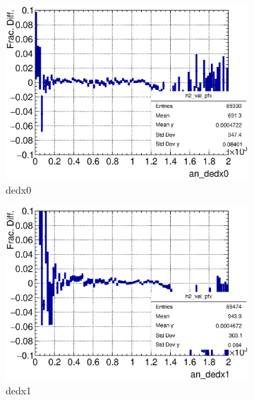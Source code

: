  \begin{figure}[t]
      \centering
      \begin{subfigure}{\dbfigwid\textwidth}
           \includegraphics[width=\textwidth]{figures/sel/ans_dedx0_vs_p_pr_res_hist2d_al2_selpr_con_slice.eps}
           \caption{dedx0}
           \label{subfig:ans-dedx0-ppr-slice}
      \end{subfigure}
      \begin{subfigure}{\dbfigwid\textwidth}
           \includegraphics[width=\textwidth]{figures/sel/ans_dedx1_vs_p_pr_res_hist2d_al2_selpr_con_slice.eps}
           \caption{dedx1}
           \label{subfig:dedx1}
      \end{subfigure}
      \\
      \begin{subfigure}{\dbfigwid\textwidth}

\end{subfigure}
\end{figure}
